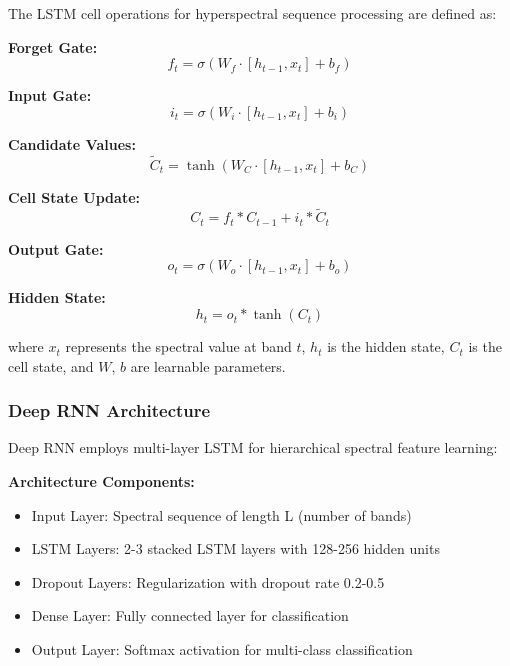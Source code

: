 \documentclass[journal]{IEEEtran}
\begin{document}
The LSTM cell operations for hyperspectral sequence processing are defined as:

\textbf{Forget Gate:}
\begin{equation}
f_t = \sigma(W_f \cdot [h_{t-1}, x_t] + b_f)
\end{equation}

\textbf{Input Gate:}
\begin{equation}
i_t = \sigma(W_i \cdot [h_{t-1}, x_t] + b_i)
\end{equation}

\textbf{Candidate Values:}
\begin{equation}
\tilde{C}_t = \tanh(W_C \cdot [h_{t-1}, x_t] + b_C)
\end{equation}

\textbf{Cell State Update:}
\begin{equation}
C_t = f_t * C_{t-1} + i_t * \tilde{C}_t
\end{equation}

\textbf{Output Gate:}
\begin{equation}
o_t = \sigma(W_o \cdot [h_{t-1}, x_t] + b_o)
\end{equation}

\textbf{Hidden State:}
\begin{equation}
h_t = o_t * \tanh(C_t)
\end{equation}

where $x_t$ represents the spectral value at band $t$, $h_t$ is the hidden state, $C_t$ is the cell state, and $W$, $b$ are learnable parameters.

\subsubsection{Deep RNN Architecture}

Deep RNN \cite{mou2019deep} employs multi-layer LSTM for hierarchical spectral feature learning:

\textbf{Architecture Components:}
\begin{itemize}
\item Input Layer: Spectral sequence of length L (number of bands)
\item LSTM Layers: 2-3 stacked LSTM layers with 128-256 hidden units
\item Dropout Layers: Regularization with dropout rate 0.2-0.5
\item Dense Layer: Fully connected layer for classification
\item Output Layer: Softmax activation for multi-class classification
\end{itemize}
\end{document}
